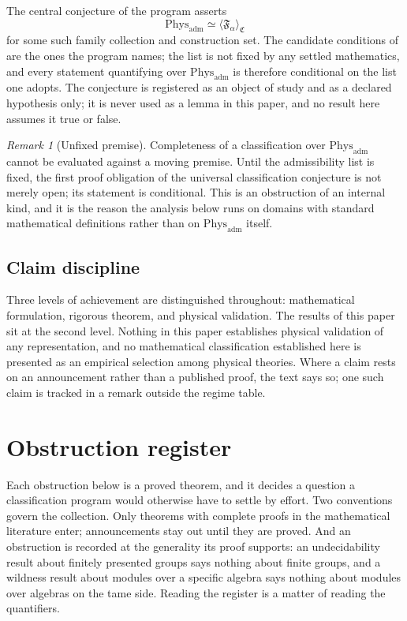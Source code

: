 \documentclass[11pt,letterpaper]{article}
\theoremstyle{definition}
\theoremstyle{remark}
\newtheorem{remark}[theorem]{Remark}
\begin{document}
The central conjecture of the program asserts
\[
\mathrm{Phys}_{\mathrm{adm}} \simeq \langle \mathfrak{F}_\alpha \rangle_{\mathfrak{C}}
\]
for some such family collection and construction set. The candidate conditions of  are the ones the program names; the list is not fixed by any settled mathematics, and every statement quantifying over $\mathrm{Phys}_{\mathrm{adm}}$ is therefore conditional on the list one adopts. The conjecture is registered as an object of study and as a declared hypothesis only; it is never used as a lemma in this paper, and no result here assumes it true or false.

\begin{remark}[Unfixed premise]
\label{rem:unfixed}
Completeness of a classification over $\mathrm{Phys}_{\mathrm{adm}}$ cannot be evaluated against a moving premise. Until the admissibility list is fixed, the first proof obligation of the universal classification conjecture is not merely open; its statement is conditional. This is an obstruction of an internal kind, and it is the reason the analysis below runs on domains with standard mathematical definitions rather than on $\mathrm{Phys}_{\mathrm{adm}}$ itself.
\end{remark}

\subsection{Claim discipline}

Three levels of achievement are distinguished throughout: mathematical formulation, rigorous theorem, and physical validation. The results of this paper sit at the second level. Nothing in this paper establishes physical validation of any representation, and no mathematical classification established here is presented as an empirical selection among physical theories. Where a claim rests on an announcement rather than a published proof, the text says so; one such claim is tracked in a remark outside the regime table.

\section{Obstruction register}

Each obstruction below is a proved theorem, and it decides a question a classification program would otherwise have to settle by effort. Two conventions govern the collection. Only theorems with complete proofs in the mathematical literature enter; announcements stay out until they are proved. And an obstruction is recorded at the generality its proof supports: an undecidability result about finitely presented groups says nothing about finite groups, and a wildness result about modules over a specific algebra says nothing about modules over algebras on the tame side. Reading the register is a matter of reading the quantifiers.
\end{document}
